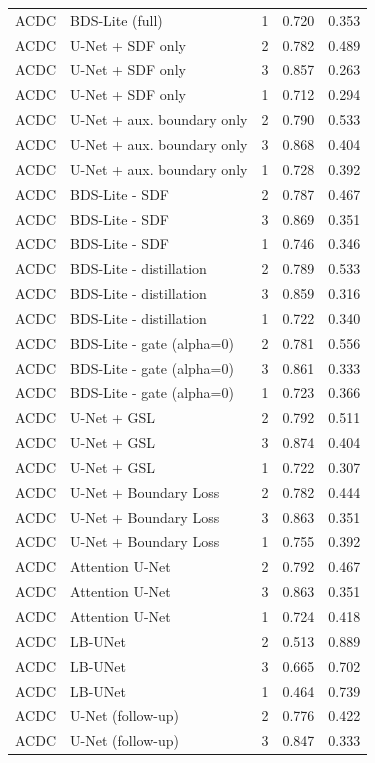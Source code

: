 \begin{longtable}{lllll}
ACDC & BDS-Lite (full) & 1 & 0.720 & 0.353 \\
ACDC & U-Net + SDF only & 2 & 0.782 & 0.489 \\
ACDC & U-Net + SDF only & 3 & 0.857 & 0.263 \\
ACDC & U-Net + SDF only & 1 & 0.712 & 0.294 \\
ACDC & U-Net + aux. boundary only & 2 & 0.790 & 0.533 \\
ACDC & U-Net + aux. boundary only & 3 & 0.868 & 0.404 \\
ACDC & U-Net + aux. boundary only & 1 & 0.728 & 0.392 \\
ACDC & BDS-Lite - SDF & 2 & 0.787 & 0.467 \\
ACDC & BDS-Lite - SDF & 3 & 0.869 & 0.351 \\
ACDC & BDS-Lite - SDF & 1 & 0.746 & 0.346 \\
ACDC & BDS-Lite - distillation & 2 & 0.789 & 0.533 \\
ACDC & BDS-Lite - distillation & 3 & 0.859 & 0.316 \\
ACDC & BDS-Lite - distillation & 1 & 0.722 & 0.340 \\
ACDC & BDS-Lite - gate (alpha=0) & 2 & 0.781 & 0.556 \\
ACDC & BDS-Lite - gate (alpha=0) & 3 & 0.861 & 0.333 \\
ACDC & BDS-Lite - gate (alpha=0) & 1 & 0.723 & 0.366 \\
ACDC & U-Net + GSL & 2 & 0.792 & 0.511 \\
ACDC & U-Net + GSL & 3 & 0.874 & 0.404 \\
ACDC & U-Net + GSL & 1 & 0.722 & 0.307 \\
ACDC & U-Net + Boundary Loss & 2 & 0.782 & 0.444 \\
ACDC & U-Net + Boundary Loss & 3 & 0.863 & 0.351 \\
ACDC & U-Net + Boundary Loss & 1 & 0.755 & 0.392 \\
ACDC & Attention U-Net & 2 & 0.792 & 0.467 \\
ACDC & Attention U-Net & 3 & 0.863 & 0.351 \\
ACDC & Attention U-Net & 1 & 0.724 & 0.418 \\
ACDC & LB-UNet & 2 & 0.513 & 0.889 \\
ACDC & LB-UNet & 3 & 0.665 & 0.702 \\
ACDC & LB-UNet & 1 & 0.464 & 0.739 \\
ACDC & U-Net (follow-up) & 2 & 0.776 & 0.422 \\
ACDC & U-Net (follow-up) & 3 & 0.847 & 0.333 \\

\end{longtable}
